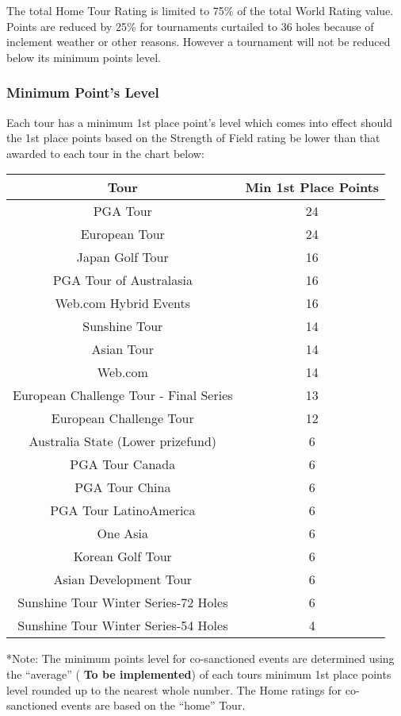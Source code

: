 \documentclass{article}
\begin{document}
The total Home Tour Rating is limited to 75\% of the total World Rating value. \\
Points are reduced by 25\% for tournaments curtailed to 36 holes because of inclement weather or other reasons. However a tournament will not be reduced below its minimum points level.

\subsubsection{Minimum Point’s Level}

Each tour has a minimum 1st place point’s level which comes into effect should the 1st place points based on the Strength of Field rating be lower than that awarded to each tour in the chart below:

\begin{center}
\begin{tabular}{ | c | c | }
\hline

Tour &	Min 1st Place Points\\
\hline
PGA Tour	&24\\
European Tour	&24\\
Japan Golf Tour&	16\\
PGA Tour of Australasia&	16\\
 Web.com Hybrid Events	&16\\
Sunshine Tour	&14\\
Asian Tour	&14\\
Web.com	&14\\
European Challenge Tour - Final Series	&13 \\
European Challenge Tour	&12\\
Australia State (Lower prizefund)&	6\\
PGA Tour Canada	&6\\
PGA Tour China	&6\\
PGA Tour LatinoAmerica&	6\\
One Asia	&6\\
Korean Golf Tour&	6\\
Asian Development Tour&	6\\
Sunshine Tour Winter Series-72 Holes&	6\\
Sunshine Tour Winter Series-54 Holes	&4\\
\hline
\end{tabular}
\end{center}

*Note: The minimum points level for co-sanctioned events are determined using the “average” (
\textbf{\color{orange} To be implemented}) of each tours minimum 1st place points level rounded up to the nearest whole number. The Home ratings for co-sanctioned events are based on the “home” Tour.
\end{document}
